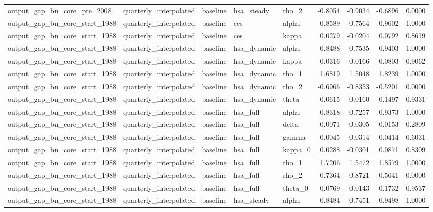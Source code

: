 \begin{tabular}{lllllrrrr}
output\_gap\_bn\_core\_pre\_2008 & quarterly\_interpolated & baseline & hsa\_steady & rho\_2 & -0.8054 & -0.9034 & -0.6896 & 0.0000 \\
output\_gap\_bn\_core\_start\_1988 & quarterly\_interpolated & baseline & ces & alpha & 0.8589 & 0.7564 & 0.9602 & 1.0000 \\
output\_gap\_bn\_core\_start\_1988 & quarterly\_interpolated & baseline & ces & kappa & 0.0279 & -0.0204 & 0.0792 & 0.8619 \\
output\_gap\_bn\_core\_start\_1988 & quarterly\_interpolated & baseline & hsa\_dynamic & alpha & 0.8488 & 0.7535 & 0.9403 & 1.0000 \\
output\_gap\_bn\_core\_start\_1988 & quarterly\_interpolated & baseline & hsa\_dynamic & kappa & 0.0316 & -0.0166 & 0.0803 & 0.9062 \\
output\_gap\_bn\_core\_start\_1988 & quarterly\_interpolated & baseline & hsa\_dynamic & rho\_1 & 1.6819 & 1.5048 & 1.8239 & 1.0000 \\
output\_gap\_bn\_core\_start\_1988 & quarterly\_interpolated & baseline & hsa\_dynamic & rho\_2 & -0.6966 & -0.8353 & -0.5201 & 0.0000 \\
output\_gap\_bn\_core\_start\_1988 & quarterly\_interpolated & baseline & hsa\_dynamic & theta & 0.0615 & -0.0160 & 0.1497 & 0.9331 \\
output\_gap\_bn\_core\_start\_1988 & quarterly\_interpolated & baseline & hsa\_full & alpha & 0.8318 & 0.7257 & 0.9373 & 1.0000 \\
output\_gap\_bn\_core\_start\_1988 & quarterly\_interpolated & baseline & hsa\_full & delta & -0.0071 & -0.0305 & 0.0153 & 0.2809 \\
output\_gap\_bn\_core\_start\_1988 & quarterly\_interpolated & baseline & hsa\_full & gamma & 0.0045 & -0.0314 & 0.0414 & 0.6031 \\
output\_gap\_bn\_core\_start\_1988 & quarterly\_interpolated & baseline & hsa\_full & kappa\_0 & 0.0288 & -0.0301 & 0.0871 & 0.8309 \\
output\_gap\_bn\_core\_start\_1988 & quarterly\_interpolated & baseline & hsa\_full & rho\_1 & 1.7206 & 1.5472 & 1.8579 & 1.0000 \\
output\_gap\_bn\_core\_start\_1988 & quarterly\_interpolated & baseline & hsa\_full & rho\_2 & -0.7364 & -0.8721 & -0.5641 & 0.0000 \\
output\_gap\_bn\_core\_start\_1988 & quarterly\_interpolated & baseline & hsa\_full & theta\_0 & 0.0769 & -0.0143 & 0.1732 & 0.9537 \\
output\_gap\_bn\_core\_start\_1988 & quarterly\_interpolated & baseline & hsa\_steady & alpha & 0.8484 & 0.7451 & 0.9498 & 1.0000 \\

\end{tabular}
